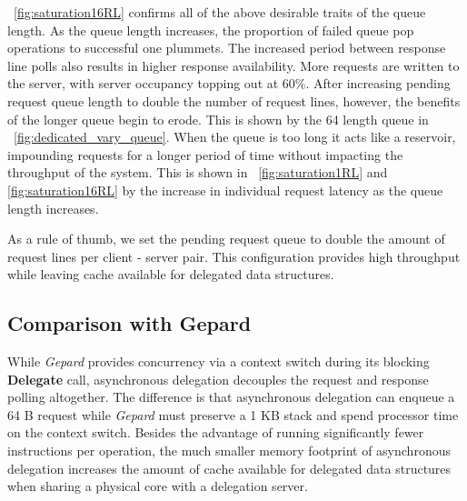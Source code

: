 \documentclass{uicthesi}
\begin{document}
~\ref{fig:saturation16RL} confirms all of the above desirable traits of the queue length. As the queue length increases, the proportion of failed queue pop operations to successful one plummets. The increased period between response line polls also results in higher response availability. More requests are written to the server, with server occupancy topping out at 60\%. After increasing pending request queue length to double the number of request lines, however, the benefits of the longer queue begin to erode. This is shown by the 64 length queue in ~\ref{fig:dedicated_vary_queue}. When the queue is too long it acts like a reservoir, impounding requests for a longer period of time without impacting the throughput of the system. This is shown in ~\ref{fig:saturation1RL} and \ref{fig:saturation16RL} by the increase in individual request latency as the queue length increases. 

As a rule of thumb, we set the pending request queue to double the amount of request lines per client - server pair. This configuration provides high throughput while leaving cache available for delegated data structures. 

\subsection{Comparison with Gepard}
While \textit{Gepard} provides concurrency via a context switch during its blocking \textbf{Delegate} call, asynchronous delegation decouples the request and response polling altogether. The difference is that asynchronous delegation can enqueue a 64 B  request while \textit{Gepard} must preserve a 1 KB stack and spend processor time on the context switch. Besides the advantage of running significantly fewer instructions per operation, the much smaller memory footprint of asynchronous delegation increases the amount of cache available for delegated data structures when sharing a physical core with a delegation server.  %
\end{document}
